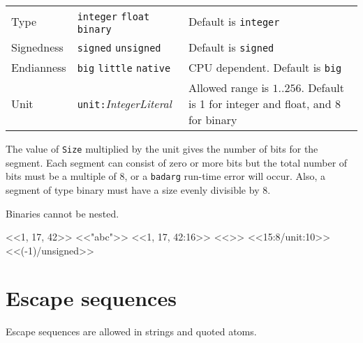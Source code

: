 \begin{center}
\begin{tabular}{|>{\raggedright}p{47pt}|>{\raggedright}p{115pt}|>{\raggedright}p{147pt}|}
\hline
\multicolumn{3}{|p{297pt}|}{Type specifiers}\tabularnewline
\hline
Type & \texttt{integer} \textbar{} \texttt{float} \textbar{} \texttt{binary} & Default
is \texttt{integer}\tabularnewline
\hline
Signedness & \texttt{signed} \textbar{} \texttt{unsigned} & Default is
\texttt{signed}\tabularnewline
\hline
Endianness & \texttt{big} \textbar{} \texttt{little} \textbar{} \texttt{native} & CPU
dependent. Default is \texttt{big}\tabularnewline
\hline
Unit & \texttt{unit:}\textit{IntegerLiteral} & Allowed range is $1..256$.
Default is 1 for integer and float, and 8 for binary\tabularnewline
\hline
\end{tabular}
\end{center}

The value of \texttt{Size} multiplied by the unit gives the number of
bits for the segment. Each segment can consist of zero or more bits
but the total number of bits must be a multiple of 8, or a
\texttt{badarg} run-time error will occur. Also, a segment of type
binary must have a size evenly divisible by 8.

Binaries cannot be nested.

\begin{erlang}
<<1, 17, 42>>       %
<<"abc">>           %
<<1, 17, 42:16>>    %
<<>>                %
<<15:8/unit:10>>    %
<<(-1)/unsigned>>   %
\end{erlang}


\section{Escape sequences}
\label{datatypes:escapeseq}
Escape sequences are allowed in strings and quoted atoms.

